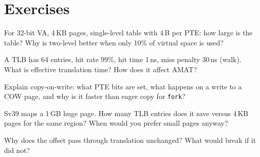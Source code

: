 \section{Exercises}
\begin{exercise}For 32-bit VA, 4\,KB pages, single-level table with 4\,B per PTE: how large is the table? Why is two-level better when only 10\% of virtual space is used?\end{exercise}
\begin{exercise}A TLB has 64 entries, hit rate 99\%, hit time 1\,ns, miss penalty 30\,ns (walk). What is effective translation time? How does it affect AMAT?\end{exercise}
\begin{exercise}Explain copy-on-write: what PTE bits are set, what happens on a write to a COW page, and why is it faster than eager copy for \texttt{fork}?\end{exercise}
\begin{exercise}Sv39 maps a 1\,GB huge page. How many TLB entries does it save versus 4\,KB pages for the same region? When would you prefer small pages anyway?\end{exercise}
\begin{exercise}Why does the offset pass through translation unchanged? What would break if it did not?\end{exercise}

